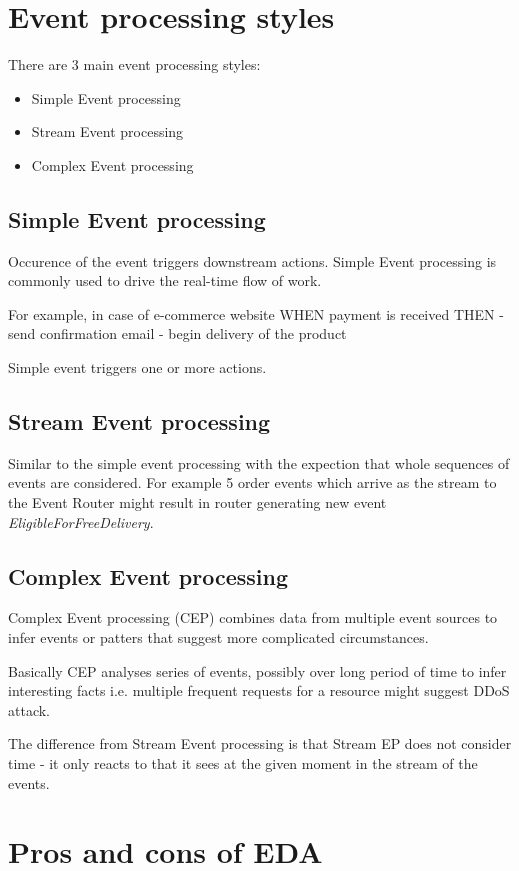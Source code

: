 \documentclass[12pt, a4paper]{article}
\begin{document}
\section{Event processing styles}
There are 3 main event processing styles:

\begin{itemize}
  \item Simple Event processing
  \item Stream Event processing
  \item Complex Event processing
\end{itemize}

\subsection{Simple Event processing}
Occurence of the event triggers downstream actions. Simple Event processing is commonly used to drive the real-time flow of work.

For example, in case of e-commerce website
WHEN payment is received THEN 
  - send confirmation email
  - begin delivery of the product

Simple event triggers one or more actions.  

\subsection{Stream Event processing}
Similar to the simple event processing with the expection that whole sequences of events are considered. For example 5 order events which arrive as the stream to the Event Router might result in router generating new event \emph{EligibleForFreeDelivery}.

\subsection{Complex Event processing}
Complex Event processing (CEP) combines data from multiple event sources to infer events or patters that suggest more complicated circumstances. 
  
Basically CEP analyses series of events, possibly over long period of time to infer interesting facts i.e. multiple frequent requests for a resource might suggest DDoS attack.

The difference from Stream Event processing is that Stream EP does not consider time - it only reacts to that it sees at the given moment in the stream of the events.

\section{Pros and cons of EDA}
\end{document}
